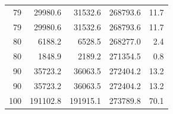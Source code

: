 \begin{table}[htbp]
\begin{tabular}{rrrrr}
    79 & \num{29980.6} & \num{31532.6} & \num{268793.6} & 11.7 \\
    79 & \num{29980.6} & \num{31532.6} & \num{268793.6} & 11.7 \\
    80 & \num{6188.2} & \num{6528.5} & \num{268277.0} & 2.4 \\
    80 & \num{1848.9} & \num{2189.2} & \num{271354.5} & 0.8 \\
    90 & \num{35723.2} & \num{36063.5} & \num{272404.2} & 13.2 \\
    90 & \num{35723.2} & \num{36063.5} & \num{272404.2} & 13.2 \\
    100 & \num{191102.8} & \num{191915.1} & \num{273789.8} & 70.1 \\
    \bottomrule
  \end{tabular}
\end{table}
